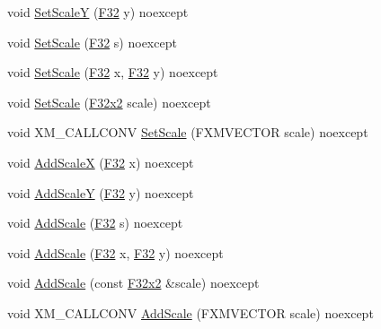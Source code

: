 \begin{DoxyCompactItemize}
\item 
void \hyperlink{classmage_1_1_texture_transform_a4bde9ccfddadb77589d0703bd7e394b6}{Set\+ScaleY} (\hyperlink{namespacemage_aa97e833b45f06d60a0a9c4fc22ae02c0}{F32} y) noexcept
\item 
void \hyperlink{classmage_1_1_texture_transform_aee6f84fbb4b7d57931aab72b6cec5b6c}{Set\+Scale} (\hyperlink{namespacemage_aa97e833b45f06d60a0a9c4fc22ae02c0}{F32} s) noexcept
\item 
void \hyperlink{classmage_1_1_texture_transform_ac3af8885cf4b4c6ad97138bbaf12cda1}{Set\+Scale} (\hyperlink{namespacemage_aa97e833b45f06d60a0a9c4fc22ae02c0}{F32} x, \hyperlink{namespacemage_aa97e833b45f06d60a0a9c4fc22ae02c0}{F32} y) noexcept
\item 
void \hyperlink{classmage_1_1_texture_transform_af9c43dc005cf657817b9a513e19dea3c}{Set\+Scale} (\hyperlink{namespacemage_aa87237ad091f5cd7da612b8523fc108f}{F32x2} scale) noexcept
\item 
void X\+M\+\_\+\+C\+A\+L\+L\+C\+O\+NV \hyperlink{classmage_1_1_texture_transform_a22ba108c7623abc2abdd8f9fde4d53bd}{Set\+Scale} (F\+X\+M\+V\+E\+C\+T\+OR scale) noexcept
\item 
void \hyperlink{classmage_1_1_texture_transform_a6b15e635a3210008086786c274233acb}{Add\+ScaleX} (\hyperlink{namespacemage_aa97e833b45f06d60a0a9c4fc22ae02c0}{F32} x) noexcept
\item 
void \hyperlink{classmage_1_1_texture_transform_a48d0a0ebd014f3fd3d8f30c750763273}{Add\+ScaleY} (\hyperlink{namespacemage_aa97e833b45f06d60a0a9c4fc22ae02c0}{F32} y) noexcept
\item 
void \hyperlink{classmage_1_1_texture_transform_a494965e060dd40a1c86f5493d734c1a7}{Add\+Scale} (\hyperlink{namespacemage_aa97e833b45f06d60a0a9c4fc22ae02c0}{F32} s) noexcept
\item 
void \hyperlink{classmage_1_1_texture_transform_a460f9fb43a5b6390d54ab72425a39ceb}{Add\+Scale} (\hyperlink{namespacemage_aa97e833b45f06d60a0a9c4fc22ae02c0}{F32} x, \hyperlink{namespacemage_aa97e833b45f06d60a0a9c4fc22ae02c0}{F32} y) noexcept
\item 
void \hyperlink{classmage_1_1_texture_transform_aafb4f17f7892edc4569757f873037ddd}{Add\+Scale} (const \hyperlink{namespacemage_aa87237ad091f5cd7da612b8523fc108f}{F32x2} \&scale) noexcept
\item 
void X\+M\+\_\+\+C\+A\+L\+L\+C\+O\+NV \hyperlink{classmage_1_1_texture_transform_a6fa7617e33c123fd09b9f1c7e06afaa1}{Add\+Scale} (F\+X\+M\+V\+E\+C\+T\+OR scale) noexcept
\item 

\end{DoxyCompactItemize}
